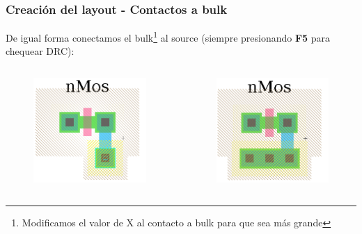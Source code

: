 \documentclass{beamer}
\begin{document}
\begin{frame}
\frametitle{Creación del layout - Contactos a bulk}
De igual forma conectamos el bulk\footnote{Modificamos el valor de X al contacto a bulk para que sea más grande} al source (siempre presionando \textbf{F5} para chequear DRC):
\begin{columns}
\begin{figure}
  \includegraphics[width=0.89\linewidth]{figuras/edicionElectric-9.png}
\end{figure}
\begin{figure}
  \includegraphics[width=0.89\linewidth]{figuras/edicionElectric-9a.png}
\end{figure}

\end{columns}

\end{frame}
\end{document}
